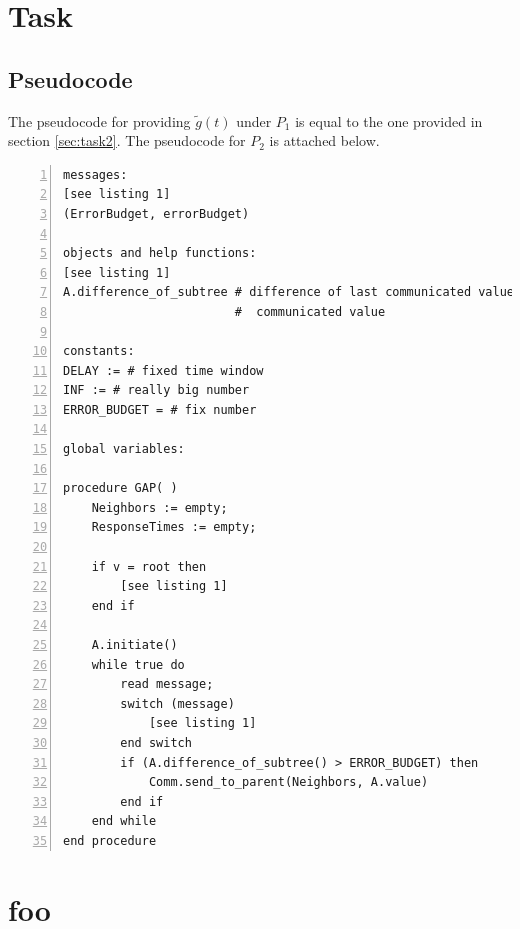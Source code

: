 \documentclass[a4paper, smallheadings,english]{scrartcl}
\begin{document}
\section{Task}
\subsection{Pseudocode}
The pseudocode for providing $\widetilde{g}(t)$ under $P_{1}$ is equal to the one provided in section \ref{sec:task2}. The pseudocode for $P_{2}$ is attached below.
\begin{lstlisting}[caption={Pseudocode for $\widetilde{f}(t)$ with error budget in $P_1$}, label={lst:2}, numbers=left, frame=single]
messages:
[see listing 1]
(ErrorBudget, errorBudget)

objects and help functions:
[see listing 1]
A.difference_of_subtree # difference of last communicated value versus current
                        #  communicated value

constants:
DELAY := # fixed time window
INF := # really big number
ERROR_BUDGET = # fix number

global variables:

procedure GAP( )
    Neighbors := empty;
    ResponseTimes := empty;

    if v = root then
        [see listing 1]
    end if

    A.initiate()
    while true do
        read message;
        switch (message)
            [see listing 1]
        end switch
        if (A.difference_of_subtree() > ERROR_BUDGET) then
            Comm.send_to_parent(Neighbors, A.value)
        end if
    end while
end procedure
\end{lstlisting}

\section{foo}
\end{document}
